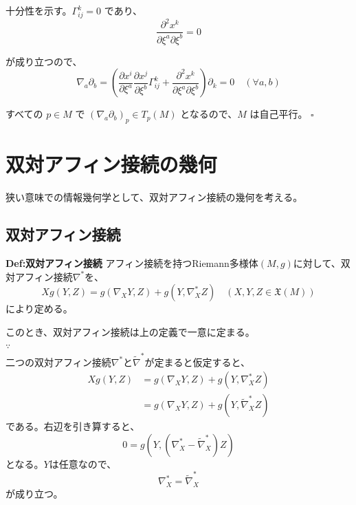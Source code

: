 \documentclass[a4paper,11pt]{jsarticle}
\numberwithin{equation}{section}
\begin{document}
十分性を示す。\(\Gamma_{ij}^k = 0\) であり、
\begin{equation}
\frac{\partial^2 x^k}{\partial \xi^a \partial \xi^b} = 0 
\end{equation}

が成り立つので、
\begin{equation}
\nabla_a \partial_b = \left( \frac{\partial x^i}{\partial \xi^a} \frac{\partial x^j}{\partial \xi^b} \Gamma_{ij}^k + \frac{\partial^2 x^k}{\partial \xi^a \partial \xi^b} \right) \partial_k = 0 \quad (\forall a, b) 
\end{equation}

すべての \(p \in M\) で \((\nabla_a \partial_b)_p \in T_p(M)\) となるので、\(M\) は自己平行。 \(\square\)

\newpage

\section{双対アフィン接続の幾何}
狭い意味での情報幾何学として、双対アフィン接続の幾何を考える。\\
\subsection{双対アフィン接続}
\begin{itembox}[l]{\textbf{Def:双対アフィン接続}}
    アフィン接続を持つRiemann多様体$(M,g)$に対して、双対アフィン接続$\nabla ^*$を、
    \begin{equation}
        Xg(Y,Z) = g(\nabla_X Y,Z) + g(Y,\nabla^*_X Z) \quad (X,Y,Z \in \mathfrak{X}(M))
    \end{equation}
    により定める。
\end{itembox}
このとき、双対アフィン接続は上の定義で一意に定まる。\\
$\because$\\
二つの双対アフィン接続$\nabla^*$と$\tilde{\nabla}^*$が定まると仮定すると、
\begin{align}
    Xg(Y,Z) &= g(\nabla_X Y,Z) + g(Y,\nabla^*_X Z) \\
    &= g(\nabla_X Y,Z) + g(Y,\tilde{\nabla}^*_X Z)
\end{align}
である。右辺を引き算すると、
\begin{equation}
    0 = g(Y,(\nabla^*_X - \tilde{\nabla}^*_X)Z)
\end{equation}
となる。$Y$は任意なので、
\begin{equation}
    \nabla^*_X = \tilde{\nabla}^*_X
\end{equation}
が成り立つ。\hfill\qedsymbol
\end{document}
